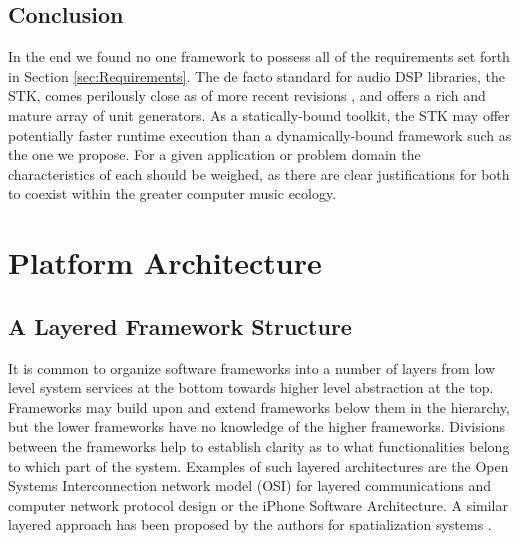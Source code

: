 \documentclass[twoside,10pt]{article}
\begin{document}


\subsection{Conclusion} %

In the end we found no one framework to possess all of the requirements set forth in Section \ref{sec:Requirements}.  The de facto standard for audio DSP libraries, the STK, comes perilously close as of more recent revisions \cite{Scavone:2005}, and offers a rich and mature array of unit generators.  As a statically-bound toolkit, the STK may offer potentially faster runtime execution than a dynamically-bound framework such as the one we propose.  For a given application or problem domain the characteristics of each should be weighed, as there are clear justifications for both to coexist within the greater computer music ecology.

%
%






\section{Platform Architecture} %

\subsection{A Layered Framework Structure}

It is common to organize software frameworks into a number of layers from low level system services at the bottom towards higher level abstraction at the top.  Frameworks may build upon and extend frameworks below them in the hierarchy, but the lower frameworks have no knowledge of the higher frameworks. Divisions between the frameworks help to establish clarity as to what functionalities belong to which part of the system.  
Examples of such layered architectures are the Open Systems Interconnection network model (OSI) \cite{web6} 
for layered communications and computer network protocol design or the iPhone Software Architecture. A similar layered approach has been proposed by the authors for spatialization systems \cite{Peters:2009}. 
\end{document}
